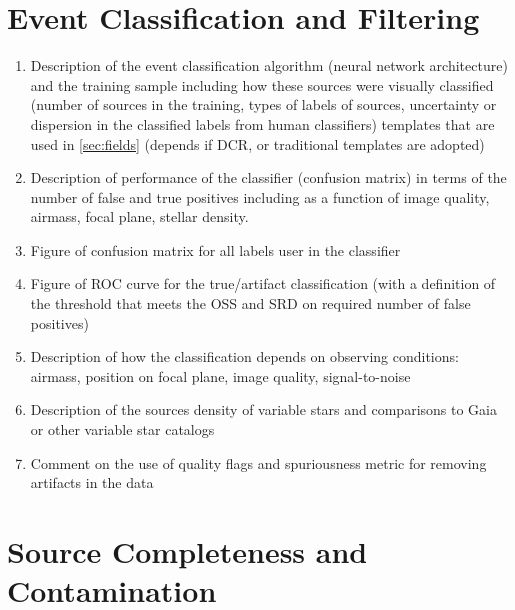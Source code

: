 \section{Event Classification and Filtering}

\begin{enumerate}

    \item Description of the event classification algorithm (neural network architecture) and the training sample including how these sources were
    visually classified (number of sources in the training, types of labels of sources, uncertainty or dispersion in the classified labels from human classifiers)
    templates that are used in \ref{sec:fields} (depends if DCR, or traditional templates are adopted)
    \item Description of performance of the classifier (confusion matrix) in terms of the number of false and true positives including as a function 
    of image quality, airmass, focal plane, stellar density.
    \item Figure of confusion matrix for all labels user in the classifier
    \item Figure of ROC curve for the true/artifact classification (with a definition of the threshold that meets the OSS and SRD on required number of false positives)
    \item Description of how the classification depends on observing conditions: airmass, position on focal plane, image quality, signal-to-noise
    \item Description of the sources density of variable stars and comparisons to Gaia or other variable star catalogs
    \item Comment on the use of quality flags and spuriousness metric for removing artifacts in the data
    
\end{enumerate}

\section{Source Completeness and Contamination}

